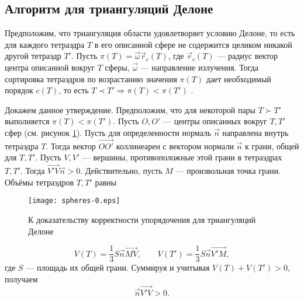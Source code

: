 \subsection{Алгоритм для триангуляций Делоне}

Предположим, что триангуляция области удовлетворяет условию Делоне, то есть для каждого тетраэдра $T$ в его описанной сфере не содержится целиком никакой другой тетраэдр $T'$.
Пусть $\pi(T) = \vec \omega \vec r_c(T)$, где $\vec r_c(T)$ --- радиус вектор центра описанной вокруг $T$ сферы, $\vec \omega$ --- направление излучения. Тогда сортировка тетраэдров по возрастанию значения $\pi(T)$ дает необходимый порядок $c(T)$, то есть $T \prec T' \Rightarrow \pi(T) < \pi(T')$ \cite{skalko2014}.

Докажем данное утверждение. Предположим, что для некоторой пары $T \succ T'$ выполняется $\pi(T) < \pi(T')$. Пусть $O, O'$ --- центры описанных вокруг $T, T'$ сфер (см. рисунок \ref{fig:spheres}). Пусть для определенности нормаль $\vec n$ направлена внутрь тетраэдра $T$. Тогда вектор $\overrightarrow{OO'}$ коллинеарен с вектором нормали $\vec n$ к грани, общей для $T, T'$. Пусть $V, V'$ --- вершины, противоположные этой грани в тетраэдрах $T, T'$. Тогда $\overrightarrow{V'V} \vec n > 0$. Действительно, пусть $M$ --- произвольная точка грани. Объёмы тетраэдров $T, T'$ равны
\begin{figure}[ht!]
\centering
\texttt{[image: spheres-0.eps]}
\caption{К доказательству корректности упорядочения для триангуляций Делоне}
\label{fig:spheres}
\end{figure}
\[
V(T) = \frac{1}{3} S \vec n \overrightarrow{MV}, \qquad V(T') = \frac{1}{3} S \vec n \overrightarrow{V'M},
\]
где $S$ --- площадь их общей грани. Суммируя и учитывая $V(T) + V(T') > 0$, получаем
\[
\vec n \overrightarrow{V'V} > 0.
\]

